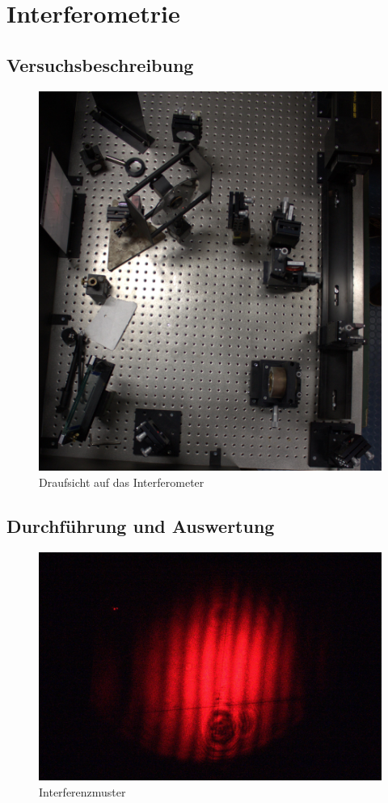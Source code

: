 \section{Interferometrie}
\subsection{Versuchsbeschreibung}

\begin{figure}[ht]
 \includegraphics[width=\textwidth]{Photos/IMG_3893.jpg}
 \caption{Draufsicht auf das Interferometer}
\end{figure}

\subsection{Durchführung und Auswertung}


\begin{figure}[ht]
 \includegraphics[width=\textwidth]{Photos/IMG_3881.jpg}
 \caption{Interferenzmuster}
\end{figure}


